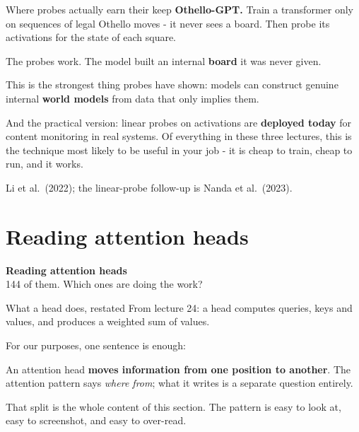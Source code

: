 \documentclass[aspectratio=169]{beamer}
\newcommand{\keybox}[1]{%
  \begin{tcolorbox}[colback=armblue!8, colframe=armblue, boxrule=0.6pt, arc=2pt]
  #1
  \end{tcolorbox}}
\newcommand{\sectiontransition}[2]{%
  \begin{frame}[plain]
    \vfill
    \begin{center}
      {\Huge\bfseries\color{popblue} #1}\\[1.1em]
      {\large #2}
    \end{center}
    \vfill
  \end{frame}}
\begin{document}
\begin{frame}{Where probes actually earn their keep}
  \vspace{0.6em}
  \textbf{Othello-GPT.} Train a transformer only on sequences of legal Othello moves - it never
  sees a board. Then probe its activations for the state of each square.

  \vspace{0.5em}
  The probes work. The model built an internal \textbf{board} it was never given.

  \vspace{0.9em}
  \keybox{This is the strongest thing probes have shown: models can construct genuine internal
  \textbf{world models} from data that only implies them.}

  \vspace{0.8em}
  And the practical version: linear probes on activations are \textbf{deployed today} for
  content monitoring in real systems. Of everything in these three lectures, this is the
  technique most likely to be useful in your job - it is cheap to train, cheap to run, and it
  works.

  \vspace{0.5em}
  {\footnotesize Li et al.\ (2022); the linear-probe follow-up is Nanda et al.\ (2023).}
\end{frame}

\section{Reading attention heads}
\sectiontransition{Reading attention heads}{144 of them. Which ones are doing the work?}

\begin{frame}{What a head does, restated}
  \vspace{0.7em}
  From lecture 24: a head computes queries, keys and values, and produces a weighted sum of
  values.

  \vspace{0.6em}
  For our purposes, one sentence is enough:

  \vspace{0.6em}
  \keybox{An attention head \textbf{moves information from one position to another}. The
  attention pattern says \emph{where from}; what it writes is a separate question entirely.}

  \vspace{0.9em}
  That split is the whole content of this section. The pattern is easy to look at, easy to
  screenshot, and easy to over-read.
\end{frame}
\end{document}
